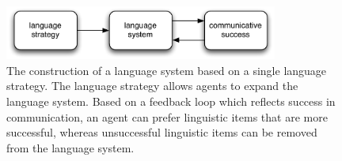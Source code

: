 \begin{figure}[b]
  \begin{center}
    \includegraphics[width=0.8\textwidth]{./intro/figures/strategies-1.pdf}
    \caption[The construction of a language system based on a single
    language strategy]{The construction of a language system based on
      a single language strategy. The language strategy allows agents
      to expand the language system. Based on a feedback loop which
      reflects success in communication, an agent can prefer linguistic
      items that are more successful, whereas unsuccessful linguistic items
      can be removed from the language system.}
    \label{f:strategies-1}
  \end{center}
\end{figure}

\addtocounter{chapter}{-1}

\thispagestyle{empty}








